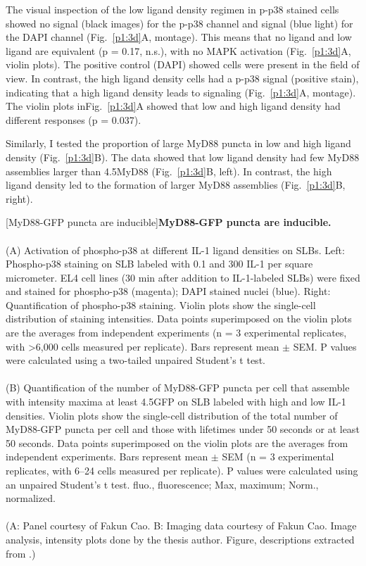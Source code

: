 The visual inspection of the low ligand density regimen in p-p38 stained cells showed no signal (black images) for the p-p38 channel and signal (blue light) for the DAPI channel (Fig.~\ref{p1:3d}A, montage). This means that no ligand and low ligand are equivalent (p = 0.17, n.s.), with no MAPK activation (Fig.~\ref{p1:3d}A, violin plots). The positive control (DAPI) showed cells were present in the field of view. In contrast, the high ligand density cells had a p-p38 signal (positive stain), indicating that a high ligand density leads to signaling (Fig.~\ref{p1:3d}A, montage). The violin plots inFig.~\ref{p1:3d}A showed that low and high ligand density had different responses (p = 0.037).

Similarly, I tested the proportion of large MyD88 puncta in low and high ligand density (Fig.~\ref{p1:3d}B). The data showed that low ligand density had few MyD88 assemblies larger than 4.5\times MyD88 (Fig.~\ref{p1:3d}B, left). In contrast, the high ligand density led to the formation of larger MyD88 assemblies (Fig.~\ref{p1:3d}B, right).


\begin{centering}
\captionsetup{parbox=none}
[MyD88-GFP puncta are inducible]{\textbf{MyD88-GFP puncta are inducible.}
\\
\\
(A) Activation of phospho-p38 at different IL-1 ligand densities on SLBs. Left: Phospho-p38 staining on SLB labeled with 0.1 and 300 IL-1{\textbeta} per square micrometer. EL4 cell lines (30 min after addition to IL-1{\textbeta}-labeled SLBs) were fixed and stained for phospho-p38 (magenta); DAPI stained nuclei (blue). Right: Quantification of phospho-p38 staining. Violin plots show the single-cell distribution of staining intensities. Data points superimposed on the violin plots are the averages from independent experiments (n = 3 experimental replicates, with >6,000 cells measured per replicate). Bars represent mean $\pm$ SEM. P values were calculated using a two-tailed unpaired Student's t test.
\\
\\
(B) Quantification of the number of MyD88-GFP puncta per cell that assemble with intensity maxima at least 4.5\times GFP on SLB labeled with high and low IL-1 densities. Violin plots show the single-cell distribution of the total number of MyD88-GFP puncta per cell and those with lifetimes under 50 seconds or at least 50 seconds. Data points superimposed on the violin plots are the averages from independent experiments. Bars represent mean $\pm$ SEM (n = 3 experimental replicates, with 6--24 cells measured per replicate). P values were calculated using an unpaired Student's t test. fluo., fluorescence; Max, maximum; Norm., normalized.
\\
\\
(A: Panel courtesy of Fakun Cao. B: Imaging data courtesy of Fakun Cao. Image analysis, intensity plots done by the thesis author. Figure, descriptions extracted from \autocite{Deliz-Aguirre_2021}.)}
\label{p1:3d}
\end{centering}

